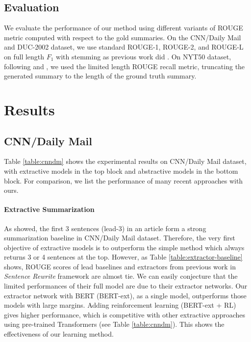\documentclass[11pt,a4paper]{article}
\begin{document}
\subsection{Evaluation}

We evaluate the performance of our method using different variants
of ROUGE metric computed with respect to the gold summaries.
On the CNN/Daily Mail and DUC-2002 dataset, we use standard ROUGE-1,
ROUGE-2, and ROUGE-L \cite{lin-2004-rouge} on full length $F_1$ with stemming
as previous work did \cite{nallapati2017summarunner, see-etal-2017-get, chen-bansal-2018-fast}.
On NYT50 dataset,
following \citet{durrett-etal-2016-learning} and \citet{paulus2018a},
we used the limited length ROUGE recall metric, truncating the generated
summary to the length of the ground truth summary.



\section{Results}

\subsection{CNN/Daily Mail}

Table \ref{table:cnndm} shows the experimental results on
CNN/Daily Mail dataset, with extractive models in the top
block and abstractive models in the bottom block. For comparison,
we list the performance of many recent approaches with ours.

\paragraph{Extractive Summarization}
As \citet{see-etal-2017-get} showed, the first 3 sentences (lead-3)
in an article form a strong summarization baseline in CNN/Daily Mail dataset.
Therefore, the very first objective of extractive models is to outperform
the simple method which always returns 3 or 4 sentences at the top.
However, as Table \ref{table:extractor-baseline} shows,
ROUGE scores of lead baselines and extractors from previous work in
\emph{Sentence Rewrite} framework \cite{chen-bansal-2018-fast, xu2019neural}
are almost tie. We can easily conjecture that the limited performances of
their full model are due to their extractor networks.
Our extractor network with BERT (BERT-ext), as a single model,
outperforms those models with large margins.
Adding reinforcement learning (BERT-ext + RL) gives higher performance,
which is competitive with other
extractive approaches using pre-trained
Transformers (see Table \ref{table:cnndm}).
This shows the effectiveness of our learning method.
\end{document}
